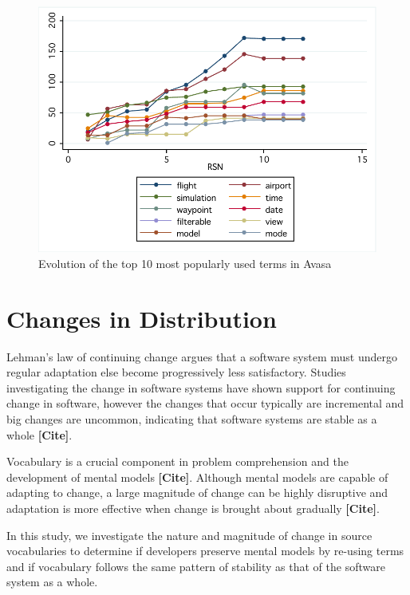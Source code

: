 \begin{figure}[t]
\centering
\includegraphics[width=\textwidth]{Figures/Vocab-AvasaPopular.pdf}
\caption{Evolution of the top 10 most popularly used terms in Avasa}
\label{fig:avasa_popular_terms_history}
\end{figure}



\section{Changes in Distribution} %
\label{sec:changes_in_distribution}

Lehman's law of continuing change argues that a software system must undergo regular adaptation else become progressively less satisfactory. Studies investigating the change in software systems have shown support for continuing change in software, however the changes that occur typically are incremental and big changes are uncommon, indicating that software systems are stable as a whole \textbf{[Cite]}.

Vocabulary is a crucial component in problem comprehension and the development of mental models \textbf{[Cite]}. Although mental models are capable of adapting to change, a large magnitude of change can be highly disruptive and adaptation is more effective when change is brought about gradually \textbf{[Cite]}.

In this study, we investigate the nature and magnitude of change in source vocabularies to determine if developers preserve mental models by re-using terms and if vocabulary follows the same pattern of stability as that of the software system as a whole.

